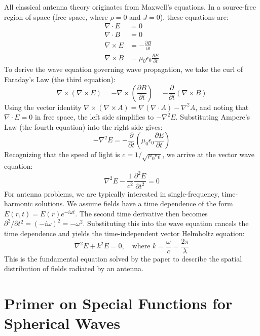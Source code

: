 \documentclass[11pt,a4paper]{article}
\begin{document}
All classical antenna theory originates from Maxwell's equations. In a source-free region of space (free space, where \(\rho=0\) and \(J=0\)), these equations are:
\begin{align}
    \nabla\cdot E &= 0 \\
    \nabla\cdot B &= 0 \\
    \nabla\times E &= -\frac{\partial B}{\partial t} \\
    \nabla\times B &= \mu_{0}\epsilon_{0}\frac{\partial E}{\partial t}
\end{align}
To derive the wave equation governing wave propagation, we take the curl of Faraday's Law (the third equation):
\begin{equation}
    \nabla\times(\nabla\times E)=-\nabla\times\left(\frac{\partial B}{\partial t}\right)=-\frac{\partial}{\partial t}(\nabla\times B)
\end{equation}
Using the vector identity \(\nabla\times(\nabla\times A)=\nabla(\nabla\cdot A)-\nabla^{2}A\), and noting that \(\nabla\cdot E=0\) in free space, the left side simplifies to \(-\nabla^{2}E\). Substituting Ampere's Law (the fourth equation) into the right side gives:
\begin{equation}
    -\nabla^{2}E=-\frac{\partial}{\partial t}\left(\mu_{0}\epsilon_{0}\frac{\partial E}{\partial t}\right)
\end{equation}
Recognizing that the speed of light is \(c=1/\sqrt{\mu_{0}\epsilon_{0}}\), we arrive at the vector wave equation:
\begin{equation}
    \nabla^{2}E-\frac{1}{c^{2}}\frac{\partial^{2}E}{\partial t^{2}}=0
\end{equation}
For antenna problems, we are typically interested in single-frequency, time-harmonic solutions. We assume fields have a time dependence of the form \(E(r,t)=E(r)e^{-i\omega t}\). The second time derivative then becomes \(\partial^{2}/\partial t^{2}=(-i\omega)^{2}=-\omega^{2}\). Substituting this into the wave equation cancels the time dependence and yields the time-independent vector Helmholtz equation:
\begin{equation}
    \nabla^{2}E+k^{2}E=0, \quad \text{where } k=\frac{\omega}{c}=\frac{2\pi}{\lambda}
\end{equation}
This is the fundamental equation solved by the paper to describe the spatial distribution of fields radiated by an antenna.

\section{Primer on Special Functions for Spherical Waves}
\end{document}

